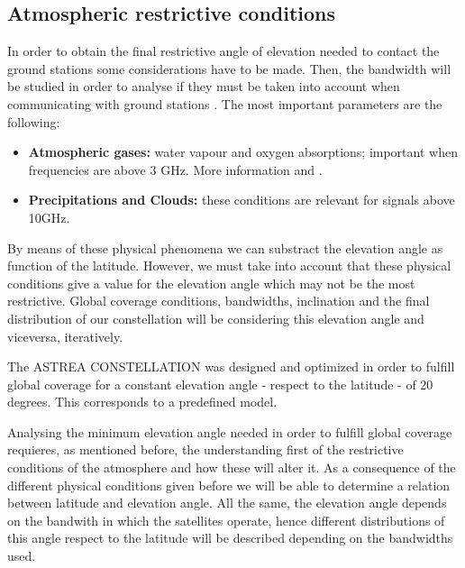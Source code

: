 \subsection{Atmospheric restrictive conditions}
In order to obtain the final restrictive angle of elevation needed to contact the ground stations some considerations have to be made. Then, the bandwidth will be studied in order to analyse if they must be taken into account when communicating with ground stations \cite{Gomez2013}. The most important parameters are the following:

\begin{itemize}
\item\textbf{ Atmospheric gases: }water vapour and oxygen absorptions; important when frequencies are above 3 GHz. More information \cite{Zubair2011} and \cite{Luini2015}.
\item\textbf{ Precipitations and Clouds: }these conditions are relevant for signals above 10GHz.
\end{itemize}

By means of these physical phenomena we can substract the elevation angle as function of the latitude. However, we must take into account that these physical conditions give a value for the elevation angle which may not be the most restrictive. Global coverage conditions, bandwidths, inclination and the final distribution of our constellation will be considering this elevation angle and viceversa, iteratively.

The ASTREA CONSTELLATION was designed and optimized in order to fulfill global coverage for a constant elevation angle - respect to the latitude - of 20 degrees. This corresponds to a predefined model.

Analysing the minimum elevation angle needed in order to fulfill global coverage requieres, as mentioned before, the understanding first of the restrictive conditions of the atmosphere and how these will alter it. As a consequence of the different physical conditions given before we will be able to determine a relation between latitude and elevation angle. All the same, the elevation angle depends on the bandwith in which the satellites operate, hence different distributions of this angle respect to the latitude will be described depending on the bandwidths used. 

